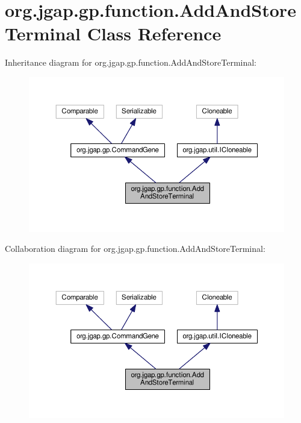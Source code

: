 \hypertarget{classorg_1_1jgap_1_1gp_1_1function_1_1_add_and_store_terminal}{\section{org.\-jgap.\-gp.\-function.\-Add\-And\-Store\-Terminal Class Reference}
\label{classorg_1_1jgap_1_1gp_1_1function_1_1_add_and_store_terminal}
}


Inheritance diagram for org.\-jgap.\-gp.\-function.\-Add\-And\-Store\-Terminal\-:
\nopagebreak
\begin{figure}[H]
\begin{center}
\leavevmode
\includegraphics[width=350pt]{classorg_1_1jgap_1_1gp_1_1function_1_1_add_and_store_terminal__inherit__graph}
\end{center}
\end{figure}


Collaboration diagram for org.\-jgap.\-gp.\-function.\-Add\-And\-Store\-Terminal\-:
\nopagebreak
\begin{figure}[H]
\begin{center}
\leavevmode
\includegraphics[width=350pt]{classorg_1_1jgap_1_1gp_1_1function_1_1_add_and_store_terminal__coll__graph}
\end{center}
\end{figure}
